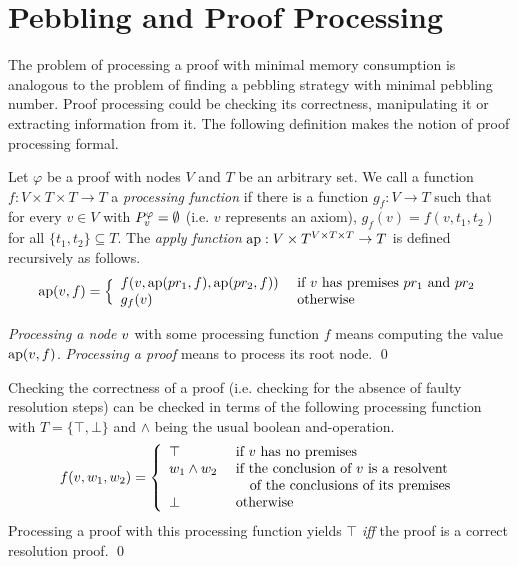 \section{Pebbling and Proof Processing}
\label{sec:pebblingchecking}

The problem of processing a proof with minimal memory consumption is analogous to the problem of finding a pebbling strategy with minimal pebbling number.
Proof processing could be checking its correctness, manipulating it or extracting information from it.
The following definition makes the notion of proof processing formal.

\begin{definition}
\label{def:proof-processing}

Let $\varphi$ be a proof with nodes $V$ and $T$ be an arbitrary set.
We call a function $f: V \times T \times T \rightarrow T$ a \emph{processing function} if there is a function $g_f: V \rightarrow T$ such that for every $v \in V$ with $P_{v}^{\varphi} = \emptyset$ (i.e. $v$ represents an axiom), $g_f(v) = f(v,t_1,t_2)$ for all $\{t_1,t_2\} \subseteq T$.
The \emph{apply function} $\operatorname{ap}: V \times T^{V\times T \times T} \rightarrow T$ is defined recursively as follows.
$$
\operatorname{ap}(v,f) = \Big\{
\begin{array}{ll}
	f(v,\operatorname{ap}(pr_1,f),\operatorname{ap}(pr_2,f)) &\text{ if } v \text{ has premises } pr_1 \text{ and } pr_2\\
	g_f(v) &\text{ otherwise}\\
\end{array}
$$

\emph{Processing a node} $v$ with some processing function $f$ means computing the value $\operatorname{ap}(v,f)$.
\emph{Processing a proof} means to process its root node.
\qed
\end{definition}

\begin{example}

Checking the correctness of a proof (i.e. checking for the absence of faulty resolution steps) can be checked in terms of the following processing function with $T = \{\top,\bot\}$ and $\wedge$ being the usual boolean and-operation.
$$
f(v,w_1,w_2) = \left\{
\begin{array}{ll}
	\top & \text{ if $v$ has no premises} \\
	w_1 \wedge w_2 &\text{ if the conclusion of $v$ is a resolvent}\\
								 &\quad \text{ of the conclusions of its premises} \\
	\bot & \text{ otherwise}
\end{array}
\right.
$$
Processing a proof with this processing function yields $\top$ \emph{iff} the proof is a correct resolution proof.
\qed
\end{example}


